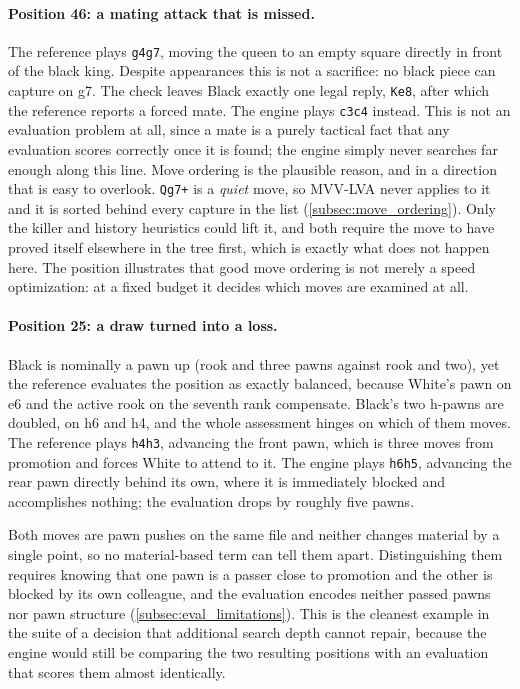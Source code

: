 \paragraph{Position 46: a mating attack that is missed.}
The reference plays \texttt{g4g7}, moving the queen to an empty square directly in
front of the black king. Despite appearances this is not a sacrifice: no black
piece can capture on g7. The check leaves Black exactly one legal reply,
\texttt{Ke8}, after which the reference reports a forced mate. The engine plays
\texttt{c3c4} instead. This is not an evaluation problem at all, since a mate is a
purely tactical fact that any evaluation scores correctly once it is found; the
engine simply never searches far enough along this line. Move ordering is the
plausible reason, and in a direction that is easy to overlook. \texttt{Qg7+} is a
\emph{quiet} move, so MVV-LVA never applies to it and it is sorted behind every
capture in the list (\cref{subsec:move_ordering}). Only the killer and history
heuristics could lift it, and both require the move to have proved itself
elsewhere in the tree first, which is exactly what does not happen here. The
position illustrates that good move ordering is not merely a speed optimization:
at a fixed budget it decides which moves are examined at all.

\paragraph{Position 25: a draw turned into a loss.}
Black is nominally a pawn up (rook and three pawns against rook and two), yet the
reference evaluates the position as exactly balanced, because White's pawn on e6
and the active rook on the seventh rank compensate. Black's two h-pawns are
doubled, on h6 and h4, and the whole assessment hinges on which of them moves. The
reference plays \texttt{h4h3}, advancing the front pawn, which is three moves from
promotion and forces White to attend to it. The engine plays \texttt{h6h5},
advancing the rear pawn directly behind its own, where it is immediately blocked
and accomplishes nothing; the evaluation drops by roughly five pawns.

Both moves are pawn pushes on the same file and neither changes material by a
single point, so no material-based term can tell them apart. Distinguishing them
requires knowing that one pawn is a passer close to promotion and the other is
blocked by its own colleague, and the evaluation encodes neither passed pawns nor
pawn structure (\cref{subsec:eval_limitations}). This is the cleanest example in
the suite of a decision that additional search depth cannot repair, because the
engine would still be comparing the two resulting positions with an evaluation
that scores them almost identically.

